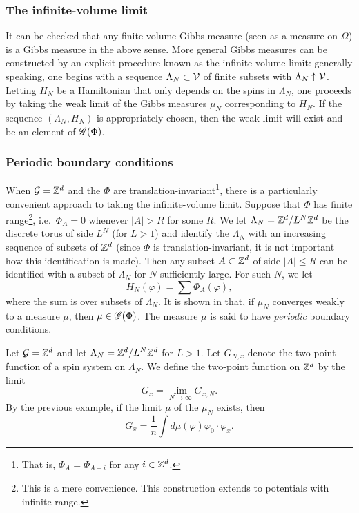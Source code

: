 \subsubsection{The infinite-volume limit}

It can be checked that any finite-volume Gibbs measure (seen as a measure on $\Omega$) is a
Gibbs measure in the above sense. More general Gibbs measures can be constructed by an explicit
procedure known as the infinite-volume limit: generally speaking, one begins with a sequence
$\Lambda_N \subset \mathcal{V}$ of finite subsets with $\Lambda_N\uparrow\mathcal{V}$. Letting
$H_N$ be a Hamiltonian that only depends on the spins in $\Lambda_N$, one proceeds by taking
the weak limit of the Gibbs measures $\mu_N$ corresponding to $H_N$. If the sequence
$(\Lambda_N, H_N)$ is appropriately chosen, then the weak limit will exist and be an element
of $\mathscr{G}(\Phi)$.

\subsubsection{Periodic boundary conditions}

When $\mathcal{G} = { {{\mathbb Z}}^d }$ and the $\Phi$ are translation-invariant\footnote{That is, $\Phi_A = \Phi_{A+i}$
for any $i\in{ {{\mathbb Z}}^d }$.}, there is a particularly convenient approach to taking the infinite-volume
limit. Suppose that $\Phi$ has finite range\footnote{This is a mere convenience. This construction
extends to potentials with infinite range.}, i.e.\ $\Phi_A = 0$ whenever $|A| > R$ for some $R$.
We let $\Lambda_N = { {{\mathbb Z}}^d }/L^N{ {{\mathbb Z}}^d }$ be the discrete torus of side $L^N$ (for $L > 1$) and identify
the $\Lambda_N$ with an increasing sequence of subsets of ${ {{\mathbb Z}}^d }$ (since $\Phi$ is translation-invariant,
it is not important how this identification is made). Then any subset $A \subset { {{\mathbb Z}}^d }$ of side
$|A| \le R$ can be identified with a subset of $\Lambda_N$ for $N$ sufficiently large. For such
$N$, we let
\begin{equation}
H_N(\varphi) = \sum \Phi_A(\varphi),
\end{equation}
where the sum is over subsets of $\Lambda_N$. 
It is shown in \cite[Example 4.20]{Georgii11} that, if $\mu_N$
converges weakly to a measure $\mu$, then $\mu \in \mathscr{G}(\Phi)$. The measure $\mu$ is said to have
\emph{periodic} boundary conditions.

\begin{example}
Let $\mathcal{G} = { {{\mathbb Z}}^d }$ and let $\Lambda_N = { {{\mathbb Z}}^d }/L^N{ {{\mathbb Z}}^d }$ for $L > 1$.
Let $G_{N,x}$ denote the two-point function of a spin system on $\Lambda_N$.
We define the two-point function on ${ {{\mathbb Z}}^d }$ by the limit
\begin{equation}
G_x = \lim_{N\to\infty} G_{x,N}.
\end{equation}
By the previous example, if the limit $\mu$ of the $\mu_N$ exists, then
\begin{equation}
G_x = \frac{1}{n} \int d\mu(\varphi) \varphi_0 \cdot \varphi_x.
\end{equation}
\end{example}

